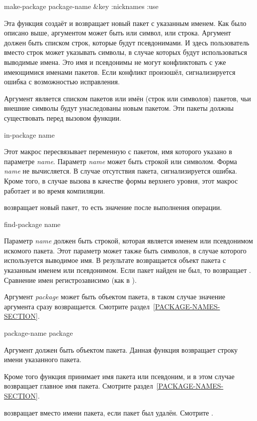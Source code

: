 \begin{defun}[Функция]
make-package package-name &key :nicknames :use

Эта функция создаёт и возвращает новый пакет с указанным именем. Как было
описано выше, аргументом может быть или символ, или строка. Аргумент
 должен быть списком строк, которые будут псевдонимами. И здесь
пользователь вместо строк может указывать символы, в случае которых будут
использоваться выводимые имена. Это имя и псевдонимы не могут конфликтовать с
уже имеющимися именами пакетов. Если конфликт произошёл, сигнализируется ошибка
с возможностью исправления.

Аргумент  является списком пакетов или имён (строк или символов)
пакетов, чьи внешние символы будут унаследованы новым пакетом. Эти пакеты должны
существовать перед вызовом функции. 
\end{defun}

\begin{defmac}
in-package name

Этот макрос пересвязывает переменную  с пакетом, имя которого
указано в параметре \emph{name}. Параметр \emph{name} может быть строкой или
символом. Форма \emph{name} не вычисляется.
В случае отсутствия пакета, сигнализируется ошибка.
Кроме того, в случае вызова в качестве формы верхнего уровня, этот макрос
работает и во время компиляции.

 возвращает новый пакет, то есть значение  после
выполнения операции.
\end{defmac}

\begin{defun}[Функция]
find-package name

Параметр \emph{name} должен быть строкой, которая является именем или
псевдонимом искомого пакета. Этот параметр может также быть символов, в случае
которого используется выводимое имя. В результате возвращается объект пакета с
указанным именем или псевдонимом. Если пакет найден не был, то
 возвращает {\false}.
Сравнение имен регистрозависимо (как в ).

Аргумент \emph{package} может быть объектом пакета, в таком случае значение
аргумента сразу возвращается. Смотрите раздел~\ref{PACKAGE-NAMES-SECTION}.
\end{defun}

\begin{defun}[Функция]
package-name package

Аргумент должен быть объектом пакета. Данная функция возвращает строку имени
указанного пакета.

Кроме того функция принимает имя пакета или псевдоним, и в этом случае
возвращает главное имя пакета. Смотрите раздел~\ref{PACKAGE-NAMES-SECTION}.

 возвращает  вместо имени пакета, если пакет был
удалён. Смотрите .
\end{defun}

